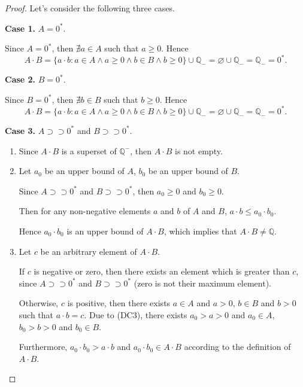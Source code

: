 \begin{proof}
    \par Let's consider the following three cases.
    \par \textbf{Case 1.} $A = {0}^{*}$.
    \par Since $A = {0}^{*}$, then $\nexists a\in A$ such that $a\ge 0$. Hence
    \[
        A\cdot B = \{ a\cdot b: a\in A\land a\ge 0\land b\in B\land b\ge 0 \} \cup\mathbb{Q}_{-} = \varnothing\cup\mathbb{Q}_{-} = \mathbb{Q}_{-} = {0}^{*}.
    \]
    \par \textbf{Case 2.} $B = {0}^{*}$.
    \par Since $B = {0}^{*}$, then $\nexists b\in B$ such that $b\ge 0$. Hence
    \[
        A\cdot B = \{ a\cdot b: a\in A\land a\ge 0\land b\in B\land b\ge 0 \} \cup\mathbb{Q}_{-} = \varnothing\cup\mathbb{Q}_{-} = \mathbb{Q}_{-} = {0}^{*}.
    \]
    \par \textbf{Case 3.} $A\supset\supset{0}^{*}$ and $B\supset\supset{0}^{*}$.
    \begin{enumerate}[label = (\roman*)]
        \item Since $A\cdot B$ is a superset of $\mathbb{Q}^{-}$, then $A\cdot B$ is not empty.
        \item Let $a_{0}$ be an upper bound of $A$, $b_{0}$ be an upper bound of $B$.
              \par Since $A\supset\supset{0}^{*}$ and $B\supset\supset{0}^{*}$, then $a_{0}\ge 0$ and $b_{0}\ge 0$.
              \par Then for any non-negative elements $a$ and $b$ of $A$ and $B$, $a\cdot b \le a_{0}\cdot b_{0}$.
              \par Hence $a_{0}\cdot b_{0}$ is an upper bound of $A\cdot B$, which implies that $A\cdot B\ne\mathbb{Q}$.
        \item Let $c$ be an arbitrary element of $A\cdot B$.
              \par If $c$ is negative or zero, then there exists an element which is greater than $c$, since $A\supset\supset {0}^{*}$ and $B\supset\supset {0}^{*}$ (zero is not their maximum element).
              \par Otherwise, $c$ is positive, then there exists $a\in A$ and $a > 0$, $b\in B$ and $b > 0$ such that $a\cdot b = c$. Due to (DC3), there exists $a_{0} > a > 0$ and $a_{0}\in A$, $b_{0} > b > 0$ and $b_{0}\in B$.
              \par Furthermore, $a_{0}\cdot b_{0} > a\cdot b$ and $a_{0}\cdot b_{0}\in A\cdot B$ according to the definition of $A\cdot B$.

\end{enumerate}
\end{proof}
